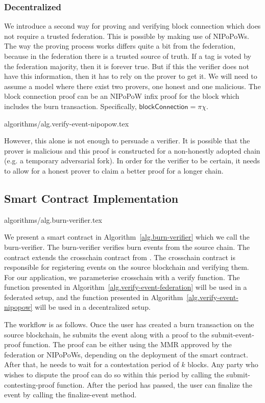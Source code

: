 \subsubsection{Decentralized}
We introduce a second way for proving and verifying block connection which does not require a trusted federation. This is possible by making use of NIPoPoWs. The way the proving process works differs quite a bit from the federation, because in the federation there is a trusted source of truth. If a tag is voted by the federation majority, then it is forever true. But if this the verifier does not have this information, then it has to rely on the prover to get it. We will need to assume a model where there exist two provers, one honest and one malicious. The block connection proof can be an NIPoPoW infix proof for the block which includes the burn transaction. Specifically, $\mathsf{blockConnection} = \pi\chi$.

{algorithms/alg.verify-event-nipopow.tex}

However, this alone is not enough to persuade a verifier. It is possible that the prover is malicious and this proof is constructed for a non-honestly adopted chain (e.g. a temporary adversarial fork). In order for the verifier to be certain, it needs to allow for a honest prover to claim a better proof for a longer chain.

\subsection{Smart Contract Implementation}
{algorithms/alg.burn-verifier.tex}

We present a smart contract in Algorithm~\ref{alg.burn-verifier} which we call the \textsf{burn-verifier}. The \textsf{burn-verifier} verifies burn events from the source chain. The contract extends the \textsf{crosschain} contract from \cite{pow-sidechains}. The \textsf{crosschain} contract is responsible for registering events on the source blockchain and verifying them. For our application, we parameterise \textsf{crosschain} with a \textsf{verify} function. The function presented in Algorithm~\ref{alg.verify-event-federation} will be used in a federated setup, and the function presented in Algorithm~\ref{alg.verify-event-nipopow} will be used in a decentralized setup.

The workflow is as follows. Once the user has created a burn transaction on the source blockchain, he submits the event along with a proof to the \textsf{submit-event-proof} function. The proof can be either using the MMR approved by the federation or NIPoPoWs, depending on the deployment of the smart contract. After that, he needs to wait for a contestation period of $k$ blocks. Any party who wishes to dispute the proof can do so within this period by calling the \textsf{submit-contesting-proof} function. After the period has passed, the user can finalize the event by calling the \textsf{finalize-event} method.

